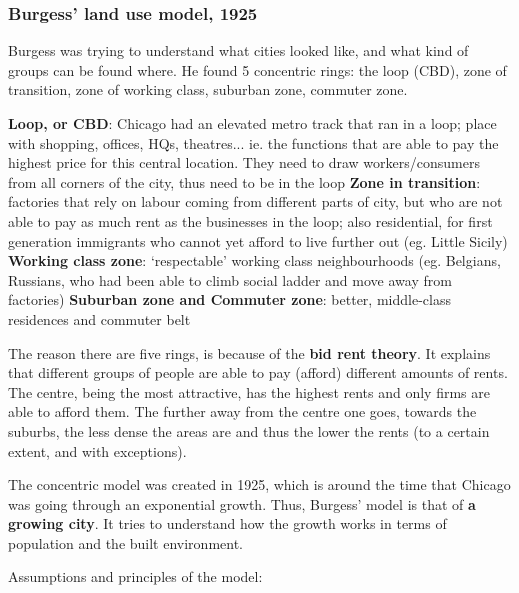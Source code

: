 \documentclass{article}
\begin{document}
\subsubsection{Burgess' land use model, 1925}

Burgess was trying to understand what cities looked like, and what kind of groups can be found where.
He found 5 concentric rings: the loop (CBD), zone of transition, zone of working class, suburban zone, commuter zone.

\begin{outline}
	\1 \textbf{Loop, or CBD}: Chicago had an elevated metro track that ran in a loop; place with shopping, offices, HQs, theatres... ie. the functions that are able to pay the highest price for this central location. They need to draw workers/consumers from all corners of the city, thus need to be in the loop
	\1 \textbf{Zone in transition}: factories that rely on labour coming from different parts of city, but who are not able to pay as much rent as the businesses in the loop; also residential, for first generation immigrants who cannot yet afford to live further out (eg. Little Sicily)
	\1 \textbf{Working class zone}: `respectable' working class neighbourhoods (eg. Belgians, Russians, who had been able to climb social ladder and move away from factories)
	\1 \textbf{Suburban zone and Commuter zone}: better, middle-class residences and commuter belt
\end{outline}

The reason there are five rings, is because of the \textbf{bid rent theory}. It explains that different groups of people are able to pay (afford) different amounts of rents. The centre, being the most attractive, has the highest rents and only firms are able to afford them. The further away from the centre one goes, towards the suburbs, the less dense the areas are and thus the lower the rents (to a certain extent, and with exceptions).

The concentric model was created in 1925, which is around the time that Chicago was going through an exponential growth. Thus, Burgess' model is that of \textbf{a growing city}. It tries to understand how the growth works in terms of population and the built environment.

Assumptions and principles of the model:
\end{document}
